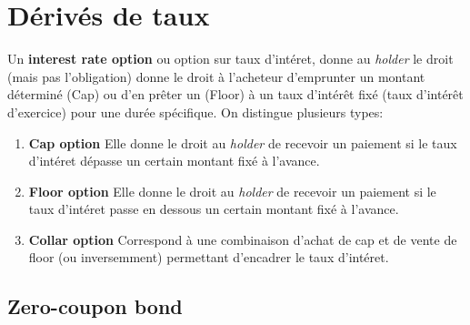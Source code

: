 \documentclass[a4paper]{article}
\begin{document}
\section{Dérivés de taux}
Un \textbf{interest rate option} ou option sur taux d'intéret, donne au \textit{holder} le droit (mais pas l'obligation) donne le droit à l'acheteur d'emprunter un montant déterminé (Cap) ou d'en prêter un (Floor) à un taux d'intérêt fixé (taux d'intérêt d'exercice) pour une durée spécifique. On distingue plusieurs types:
\begin{enumerate}[label=\textit{(\roman*)}]
    \item \textbf{Cap option} Elle donne le droit au \textit{holder} de recevoir un paiement si le taux d'intéret dépasse un certain montant fixé à l'avance.
    \item \textbf{Floor option} Elle donne le droit au \textit{holder} de recevoir un paiement si le taux d'intéret passe en dessous un certain montant fixé à l'avance.
    \item \textbf{Collar option} Correspond à une combinaison d'achat de cap et de vente de floor (ou inversemment) permettant d'encadrer le taux d'intéret.
\end{enumerate}

\subsection{Zero-coupon bond}
\end{document}
